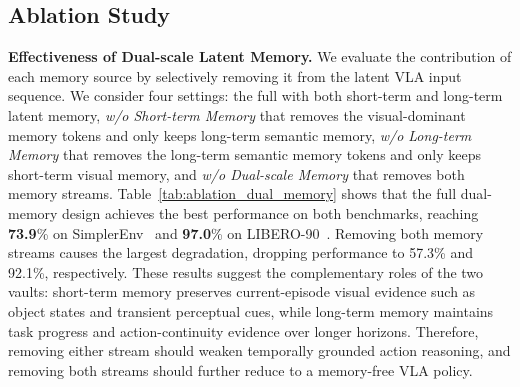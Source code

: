 \subsection{Ablation Study}
\label{sec:abation}
\noindent\textbf{Effectiveness of Dual-scale Latent Memory.}
We evaluate the contribution of each memory source by selectively removing it from the latent VLA input sequence.
We consider four settings: the full \ourmethod with both short-term and long-term latent memory, \textit{w/o Short-term Memory} that removes the visual-dominant memory tokens and only keeps long-term semantic memory, \textit{w/o Long-term Memory} that removes the long-term semantic memory tokens and only keeps short-term visual memory, and \textit{w/o Dual-scale Memory} that removes both memory streams. 
Table~\ref{tab:ablation_dual_memory} shows that the full dual-memory design achieves the best performance on both benchmarks, reaching \textbf{73.9}\% on SimplerEnv~\cite{li2025evaluating} and \textbf{97.0}\% on LIBERO-90~\cite{liu2023libero}.
Removing both memory streams causes the largest degradation, dropping performance to 57.3\% and 92.1\%, respectively.
These results suggest the complementary roles of the two vaults: short-term memory preserves current-episode visual evidence such as object states and transient perceptual cues, while long-term memory maintains task progress and action-continuity evidence over longer horizons.
Therefore, removing either stream should weaken temporally grounded action reasoning, and removing both streams should further reduce \ourmethod to a memory-free VLA policy.
\begin{table}[t]
\begin{minipage}[t]{0.49\linewidth}

\end{minipage}
\hfill
\begin{minipage}[t]{0.5\linewidth}

\end{minipage}
\vspace{-5pt}
\end{table}
% 
% 

